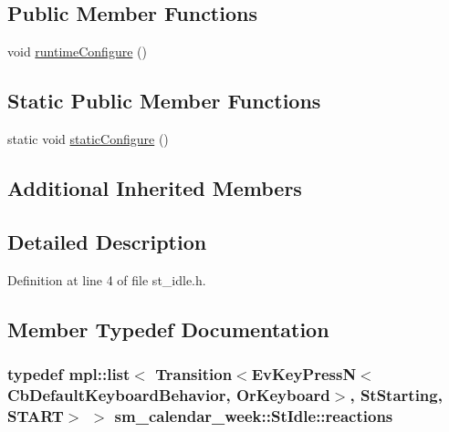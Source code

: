 \subsection*{Public Member Functions}
\begin{DoxyCompactItemize}
\item 
void \hyperlink{structsm__calendar__week_1_1StIdle_a55cd22fb5c56e2b126a36f7af74ccc95}{runtime\+Configure} ()
\end{DoxyCompactItemize}
\subsection*{Static Public Member Functions}
\begin{DoxyCompactItemize}
\item 
static void \hyperlink{structsm__calendar__week_1_1StIdle_af0614ea9314c26f444313cb30424fad8}{static\+Configure} ()
\end{DoxyCompactItemize}
\subsection*{Additional Inherited Members}


\subsection{Detailed Description}


Definition at line 4 of file st\+\_\+idle.\+h.



\subsection{Member Typedef Documentation}
\subsubsection[{\texorpdfstring{reactions}{reactions}}]{\setlength{\rightskip}{0pt plus 5cm}typedef mpl\+::list$<$ Transition$<$Ev\+Key\+PressN$<$Cb\+Default\+Keyboard\+Behavior, {\bf Or\+Keyboard}$>$, {\bf St\+Starting}, {\bf S\+T\+A\+RT}$>$ $>$ {\bf sm\+\_\+calendar\+\_\+week\+::\+St\+Idle\+::reactions}}\hypertarget{structsm__calendar__week_1_1StIdle_a78b36c84601f8d7da2db72f2f3cba544}{}\label{structsm__calendar__week_1_1StIdle_a78b36c84601f8d7da2db72f2f3cba544}


